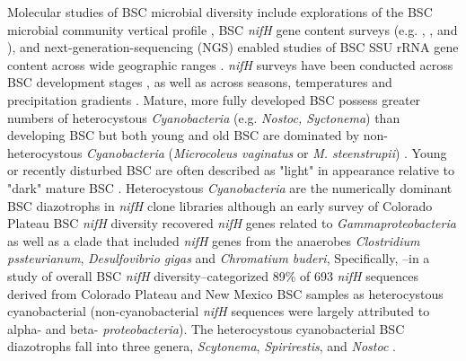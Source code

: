 Molecular studies of BSC microbial diversity include explorations of the BSC
microbial community vertical profile \citep{Garcia_Pichel_2003}, BSC
\textit{nifH} gene content surveys (e.g. \citet{14766579}, \citet{Yeager_2012},
\citet{Yeager} and \citet{Steppe_1996}), and next-generation-sequencing (NGS)
enabled studies of BSC SSU rRNA gene content across wide geographic ranges
\citep{Garcia_Pichel_2013, Steven_2013}. 
\textit{nifH} surveys have been conducted across BSC development stages
\citep{14766579}, as well as across seasons, temperatures and precipitation
gradients \citep{Yeager_2012}. Mature, more fully developed BSC possess greater
numbers of heterocystous \textit{Cyanobacteria} (e.g. \textit{Nostoc,
Syctonema}) than developing BSC but both young and old BSC are dominated by
non-heterocystous \textit{Cyanobacteria} (\textit{Microcoleus vaginatus} or
\textit{M. steenstrupii}) \citep{14766579, Garcia_Pichel_2013}. Young or
recently disturbed BSC are often described as "light" in appearance relative to
"dark" mature BSC \citep{Belnap_2002, 14766579}. Heterocystous
\textit{Cyanobacteria} are the numerically dominant BSC diazotrophs
\citep{Yeager, 14766579, Yeager_2012} in \textit{nifH} clone libraries although
an early survey of Colorado Plateau BSC \textit{nifH} diversity recovered
\textit{nifH} genes related to \textit{Gammaproteobacteria} as well as a clade
that included \textit{nifH} genes from the anaerobes \textit{Clostridium
pssteurianum}, \textit{Desulfovibrio gigas} and \textit{Chromatium buderi},
Specifically, \citet{Yeager}--in a study of overall BSC \textit{nifH}
diversity--categorized 89\% of 693 \textit{nifH} sequences derived from
Colorado Plateau and New Mexico BSC samples as heterocystous cyanobacterial
(non-cyanobacterial \textit{nifH} sequences were largely attributed to alpha-
and beta- \textit{proteobacteria}). The heterocystous cyanobacterial BSC
diazotrophs fall into three genera, \textit{Scytonema}, \textit{Spirirestis},
and \textit{Nostoc} \citep{Yeager, Yeager_2012}. 


